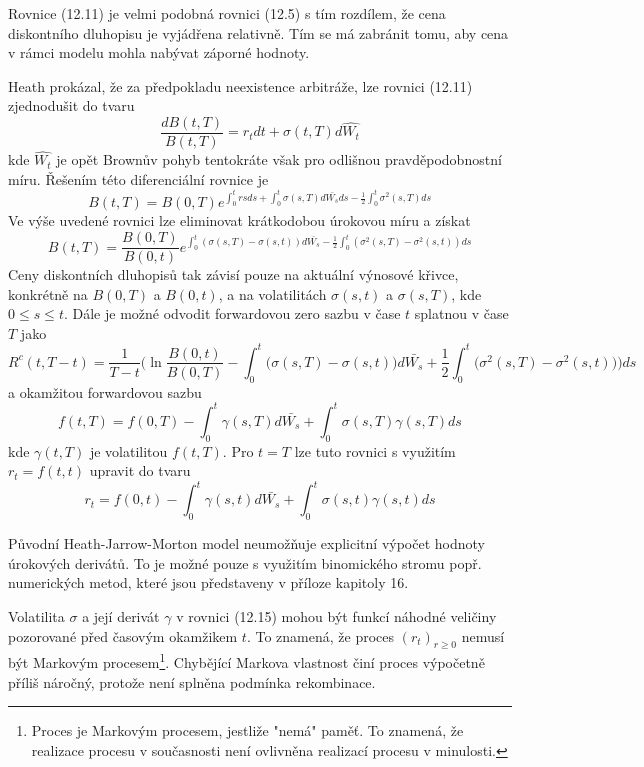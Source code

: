 \documentclass[a4paper]{book}
\begin{document}
Rovnice (12.11) je velmi podobná rovnici (12.5) s tím rozdílem, že cena diskontního dluhopisu je vyjádřena relativně. Tím se má zabránit tomu, aby cena v rámci modelu mohla nabývat záporné hodnoty.

Heath prokázal, že za předpokladu neexistence arbitráže, lze rovnici (12.11) zjednodušit do tvaru
\begin{equation*}
\frac{d B(t,T)}{B(t,T)} = r_t dt + \sigma(t,T)d \hat{W_t}
\end{equation*}
kde $\hat{W_t}$ je opět Brownův pohyb tentokráte však pro odlišnou pravděpodobnostní míru. Řešením této diferenciální rovnice je
\begin{equation}
B(t,T) = B(0,T) e^{\int_0^t rs ds + \int_0^t \sigma(s,T) d \bar{W_s}ds - \frac{1}{2}\int_0^t \sigma^2(s,T)ds}
\end{equation}
Ve výše uvedené rovnici lze eliminovat krátkodobou úrokovou míru a získat
\begin{equation}
B(t,T) = \frac{B(0,T)}{B(0,t)}e^{\int_0^t ( \sigma(s,T) - \sigma(s,t))d\bar{W_s} - \frac{1}{2}\int_0^t (\sigma^2(s,T) - \sigma^2(s,t))ds}
\end{equation}
Ceny diskontních dluhopisů tak závisí pouze na aktuální výnosové křivce, konkrétně na $B(0,T)$ a $B(0,t)$, a na volatilitách $\sigma(s,t)$ a $\sigma(s,T)$, kde $0 \le s \le t$. Dále je možné odvodit forwardovou zero sazbu v čase $t$ splatnou v čase $T$ jako
\begin{equation*}
R^c(t,T-t) = \frac{1}{T-t}\Bigg( \ln \frac{B(0,t)}{B(0,T)} - \int_0^t \big(\sigma(s,T) - \sigma(s,t) \big)d \bar{W_s} + \frac{1}{2}\int_0^t \big(\sigma^2(s,T)-\sigma^2(s,t)\big)\Bigg) ds
\end{equation*}
a okamžitou forwardovou sazbu
\begin{equation}
f(t,T) = f(0,T) - \int_0^t \gamma(s,T)d \bar{W_s} + \int_0^t \sigma(s,T)\gamma(s,T)ds
\end{equation}
kde $\gamma(t,T)$ je volatilitou $f(t,T)$. Pro $t=T$ lze tuto rovnici s využitím $r_t = f(t,t)$ upravit do tvaru
\begin{equation}
r_t = f(0,t) - \int_0^t \gamma(s,t) d \bar{W_s} + \int_0^t \sigma(s,t)\gamma(s,t)ds
\end{equation}

Původní Heath-Jarrow-Morton model neumožňuje explicitní výpočet hodnoty úrokových derivátů. To je možné pouze s využitím binomického stromu popř. numerických metod, které jsou představeny v příloze kapitoly 16.

Volatilita $\sigma$ a její derivát $\gamma$  v rovnici (12.15) mohou být funkcí náhodné veličiny pozorované před časovým okamžikem $t$. To znamená, že proces $(r_t)_{r \ge 0}$ nemusí být Markovým procesem\footnote{Proces je Markovým procesem, jestliže "nemá" paměť. To znamená, že realizace procesu v současnosti není ovlivněna realizací procesu v minulosti.}. Chybějící Markova vlastnost činí proces výpočetně příliš náročný, protože není splněna podmínka rekombinace.
\end{document}
